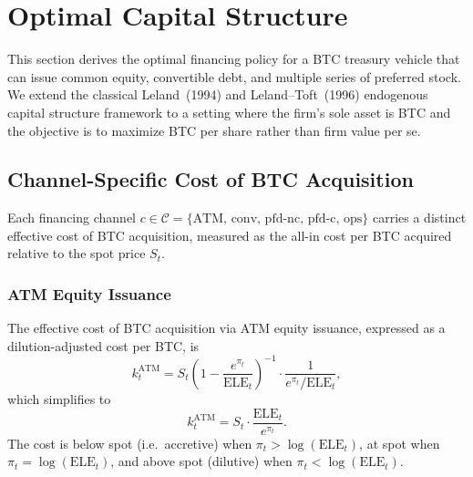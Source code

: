 
\section{Optimal Capital Structure}\label{sec:optimal_capital}

This section derives the optimal financing policy for a BTC treasury vehicle
that can issue common equity, convertible debt, and multiple series of
preferred stock.  We extend the classical Leland~(1994) and
Leland--Toft~(1996) endogenous capital structure framework to a setting where
the firm's sole asset is BTC and the objective is to maximize BTC per share
rather than firm value per se.

\subsection{Channel-Specific Cost of BTC Acquisition}\label{subsec:channel_costs}

Each financing channel $c \in \mathcal{C} = \{\text{ATM},\,\text{conv},\,
\text{pfd-nc},\,\text{pfd-c},\,\text{ops}\}$ carries a distinct effective
cost of BTC acquisition, measured as the all-in cost per BTC acquired
relative to the spot price $S_t$.

\subsubsection{ATM Equity Issuance}

\begin{proposition}\label{prop:cost_atm}
The effective cost of BTC acquisition via ATM equity issuance, expressed as
a dilution-adjusted cost per BTC, is
\begin{equation}\label{eq:k_atm}
  k_t^{\mathrm{ATM}}
  = S_t \left(1 - \frac{e^{\pi_t}}{\mathrm{ELE}_t}\right)^{-1}
    \cdot \frac{1}{e^{\pi_t} / \mathrm{ELE}_t},
\end{equation}
which simplifies to
\begin{equation}\label{eq:k_atm_simple}
  k_t^{\mathrm{ATM}} = S_t \cdot \frac{\mathrm{ELE}_t}{e^{\pi_t}}.
\end{equation}
The cost is below spot (i.e.\ accretive) when
$\pi_t > \log(\mathrm{ELE}_t)$, at spot when
$\pi_t = \log(\mathrm{ELE}_t)$, and above spot (dilutive) when
$\pi_t < \log(\mathrm{ELE}_t)$.
\end{proposition}

